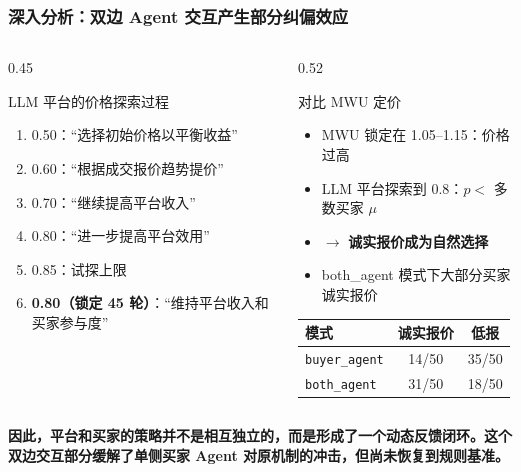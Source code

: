 \documentclass[10pt,aspectratio=169]{beamer}
\begin{document}
\begin{frame}
	\frametitle{深入分析：双边 Agent 交互产生部分纠偏效应}

	\begin{columns}[T]
		\begin{column}{0.45\textwidth}
			\begin{block}{LLM 平台的价格探索过程}
				\small
				\begin{enumerate}
					\item 0.50：``选择初始价格以平衡收益''
					\item 0.60：``根据成交报价趋势提价''
					\item 0.70：``继续提高平台收入''
					\item 0.80：``进一步提高平台效用''
					\item 0.85：试探上限
					\item \textbf{0.80（锁定 45 轮）}：``维持平台收入和买家参与度''
				\end{enumerate}
			\end{block}
		\end{column}
		\begin{column}{0.52\textwidth}
			\begin{block}{对比 MWU 定价}
				\small
				\begin{itemize}
					\item MWU 锁定在 1.05--1.15：价格过高
					\item LLM 平台探索到 0.8：$p <$ 多数买家 $\mu$
					\item $\rightarrow$ \textbf{诚实报价成为自然选择}
					\item both\_agent 模式下大部分买家诚实报价
				\end{itemize}
				\begin{tabular}{lcc}
					\toprule
					模式 & 诚实报价 & 低报 \\
					\midrule
					\texttt{buyer\_agent} & 14/50 & 35/50 \\
					\texttt{both\_agent}  & 31/50 & 18/50 \\
					\bottomrule
				\end{tabular}
			\end{block}
			\vspace{0.2cm}
		\end{column}
	\end{columns}
	
	\begin{center}
		\textbf{因此，平台和买家的策略并不是相互独立的，而是形成了一个动态反馈闭环。这个双边交互部分缓解了单侧买家 Agent 对原机制的冲击，但尚未恢复到规则基准。}
	\end{center}
\end{frame}
\end{document}
